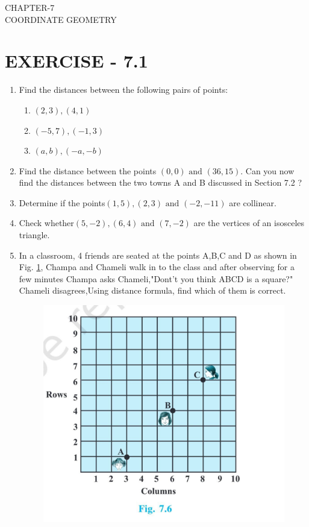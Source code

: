 \documentclass[12pt]{article}
\begin{document}
\begin{center}
\textbf\large{CHAPTER-7 \\ COORDINATE GEOMETRY}
\end{center}

\section*{EXERCISE - 7.1}
\begin{enumerate}
\item Find the distances between the following pairs of points:
\begin{enumerate}
\item $(2,3),(4,1)$
\item $(-5,7),(-1,3)$
\item $(a,b),(-a,-b)$
\end{enumerate}
\item Find the distance between the points $(0,0) \text{ and } (36,15)$. Can you now find the distances between the two towns A and B discussed in Section 7.2 ?
\item Determine if the points$(1,5),(2,3)\text{ and } (-2,-11)$ are collinear.
\item Check whether$(5,-2),(6,4) \text{ and } (7,-2)$ are the vertices of an isosceles triangle.
\item  In a classroom, 4 friends are seated at the points A,B,C and D as shown in Fig. \ref{fig:10/7/4/8Fig3}, Champa and Chameli walk in to the class and after observing for a few minutes Champa asks Chameli,"Dont't you think ABCD is a square?" Chameli disagrees,Using distance formula, find which of them is correct.

\begin{figure}[!h]
\centering
  \includegraphics[width=\columnwidth]{canvas.jpg}
 \caption{}
\label{fig:10/7/4/8Fig3}
\end{figure}


\end{enumerate}
\end{document}
